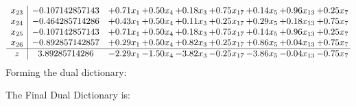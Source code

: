 \documentclass[8pt]{article}
\begin{document}
\[\begin{array}{c| c c@{\hskip 2pt} c@{\hskip 2pt} c@{\hskip 2pt} c@{\hskip 2pt} c@{\hskip 2pt} c@{\hskip 2pt} c@{\hskip 2pt} }
 x_{23}   &  -0.107142857143 & +  0.71 x_{1} & +  0.50 x_{4} & +  0.18 x_{3} & +  0.75 x_{17} & +  0.14 x_{5} & +  0.96 x_{13} & +  0.25 x_{7}\\
 x_{24}   &  -0.464285714286 & +  0.43 x_{1} & +  0.50 x_{4} & +  0.11 x_{3} & +  0.25 x_{17} & +  0.29 x_{5} & +  0.18 x_{13} & +  0.75 x_{7}\\
 x_{25}   &  -0.107142857143 & +  0.71 x_{1} & +  0.50 x_{4} & +  0.18 x_{3} & +  0.75 x_{17} & +  0.14 x_{5} & +  0.96 x_{13} & +  0.25 x_{7}\\
 x_{26}   &  -0.892857142857 & +  0.29 x_{1} & +  0.50 x_{4} & +  0.82 x_{3} & +  0.25 x_{17} & +  0.86 x_{5} & +  0.04 x_{13} & +  0.75 x_{7}\\
\hline
z    &  3.89285714286 & -2.29 x_{1} & -1.50 x_{4} & -3.82 x_{3} & -0.25 x_{17} & -3.86 x_{5} & -0.04 x_{13} & -0.75 x_{7}\\
\end{array}\]
Forming the dual dictionary:

The Final Dual Dictionary is: 
\end{document}
